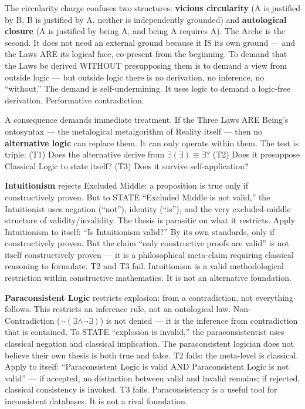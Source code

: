 \documentclass[10pt, openany, oneside]{book}
\begin{document}
The circularity charge confuses two structures: \textbf{vicious circularity} (A is justified by B, B is justified by A, neither is independently grounded) and \textbf{autological closure} (A is justified by being A, and being A requires A). The Arch\={e} is the second. It does not need an external ground because it IS its own ground --- and the Laws ARE its logical face, co-present from the beginning. To demand that the Laws be derived WITHOUT presupposing them is to demand a view from outside logic --- but outside logic there is no derivation, no inference, no ``without.'' The demand is self-undermining. It uses logic to demand a logic-free derivation. Performative contradiction.

A consequence demands immediate treatment. If the Three Laws ARE Being's ontosyntax --- the metalogical metalgorithm of Reality itself --- then no \textbf{alternative logic} can replace them. It can only operate within them. The test is triple: (T1) Does the alternative derive from $\exists(\exists) \equiv \exists$? (T2) Does it presuppose Classical Logic to state itself? (T3) Does it survive self-application?

\vspace{0.5em}

\textbf{Intuitionism} rejects Excluded Middle: a proposition is true only if constructively proven. But to STATE ``Excluded Middle is not valid,'' the Intuitionist uses negation (``not''), identity (``is''), and the very excluded-middle structure of validity/invalidity. The thesis is parasitic on what it restricts. Apply Intuitionism to itself: ``Is Intuitionism valid?'' By its own standards, only if constructively proven. But the claim ``only constructive proofs are valid'' is not itself constructively proven --- it is a philosophical meta-claim requiring classical reasoning to formulate. T2 and T3 fail. Intuitionism is a valid methodological restriction within constructive mathematics. It is not an alternative foundation.

\textbf{Paraconsistent Logic} restricts explosion: from a contradiction, not everything follows. This restricts an inference rule, not an ontological law. Non-Contradiction ($\neg(\exists \wedge \neg\exists)$) is not denied --- it is the inference from contradiction that is contained. To STATE ``explosion is invalid,'' the paraconsistentist uses classical negation and classical implication. The paraconsistent logician does not believe their own thesis is both true and false. T2 fails: the meta-level is classical. Apply to itself: ``Paraconsistent Logic is valid AND Paraconsistent Logic is not valid'' --- if accepted, no distinction between valid and invalid remains; if rejected, classical consistency is invoked. T3 fails. Paraconsistency is a useful tool for inconsistent databases. It is not a rival foundation.
\end{document}
